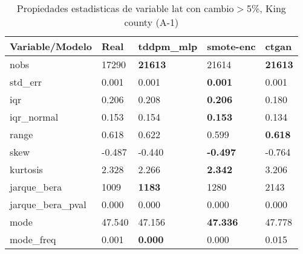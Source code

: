\begin{table}[H]
\centering
\fontsize{8}{14}\selectfont
\caption{Propiedades estadisticas de variable lat con cambio\ensuremath{>}5\%, King county (A-1)}
\label{table-stats-king county-a-1-lat-short}
\begin{tabular}{|l|m{10em}|m{10em}|m{10em}|m{10em}|}
\hline
 \rowcolor[gray]{0.8}
Variable/Modelo & Real & tddpm\_mlp & smote-enc & ctgan \\
\hline nobs & 17290 & \bfseries 21613 & \cellcolor[rgb]{0.9, 0.54, 0.52} 21614 & \bfseries 21613 \\
\hline std\_err & 0.001 & 0.001 & \bfseries 0.001 & \cellcolor[rgb]{0.9, 0.54, 0.52} 0.001 \\
\hline iqr & 0.206 & 0.208 & \bfseries 0.206 & \cellcolor[rgb]{0.9, 0.54, 0.52} 0.180 \\
\hline iqr\_normal & 0.153 & 0.154 & \bfseries 0.153 & \cellcolor[rgb]{0.9, 0.54, 0.52} 0.134 \\
\hline range & 0.618 & 0.622 & \cellcolor[rgb]{0.9, 0.54, 0.52} 0.599 & \bfseries 0.618 \\
\hline skew & -0.487 & -0.440 & \bfseries -0.497 & \cellcolor[rgb]{0.9, 0.54, 0.52} -0.764 \\
\hline kurtosis & 2.328 & 2.266 & \bfseries 2.342 & \cellcolor[rgb]{0.9, 0.54, 0.52} 3.206 \\
\hline jarque\_bera & 1009 & \bfseries 1183 & 1280 & \cellcolor[rgb]{0.9, 0.54, 0.52} 2143 \\
\hline jarque\_bera\_pval & 0.000 & 0.000 & 0.000 & 0.000 \\
\hline mode & 47.540 & \cellcolor[rgb]{0.9, 0.54, 0.52} 47.156 & \bfseries 47.336 & 47.778 \\
\hline mode\_freq & 0.001 & \bfseries 0.000 & 0.000 & \cellcolor[rgb]{0.9, 0.54, 0.52} 0.015 \\
\hline
\end{tabular}
\end{table}

